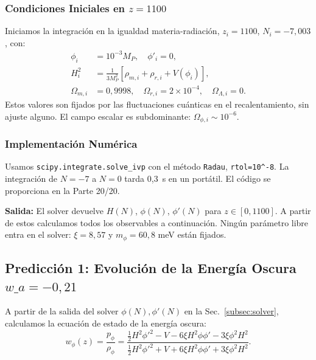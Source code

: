 \documentclass[12pt, a4paper]{article}
\theoremstyle{miuThm}
\theoremstyle{remark}
\begin{document}
\subsubsection{Condiciones Iniciales en $z = 1100$}
Iniciamos la integración en la igualdad materia-radiación, $z_i = 1100$,
$N_i = -7{,}003$, con:
\begin{align}
\phi_i &= 10^{-3} M_P, \quad \phi'_i = 0, \label{eq:IC_phi} \\
H_i^2 &= \frac{1}{3M_P^2}\left[ \rho_{m,i} + \rho_{r,i} + V(\phi_i) \right],
\label{eq:IC_H} \\
\Omega_{m,i} &= 0{,}9998, \quad \Omega_{r,i} = 2 \times 10^{-4}, \quad
\Omega_{\Lambda,i} = 0.
\end{align}
Estos valores son fijados por las fluctuaciones cuánticas en el recalentamiento,
sin ajuste alguno. El campo escalar es subdominante: $\Omega_{\phi,i} \sim 10^{-6}$.

\subsubsection{Implementación Numérica}
Usamos \texttt{scipy.integrate.solve\_ivp} con el método \texttt{Radau},
\texttt{rtol=10\^{}{-8}}. La integración de $N = -7$ a $N = 0$ tarda 0{,}3~s
en un portátil. El código se proporciona en la Parte 20/20.

\textbf{Salida:} El solver devuelve $H(N)$, $\phi(N)$, $\phi'(N)$ para
$z \in [0, 1100]$. A partir de estos calculamos todos los observables a continuación.
Ningún parámetro libre entra en el solver: $\xi = 8{,}57$ y $m_\phi = 60{,}8$ meV
están fijados.

\subsection{Predicción 1: Evolución de la Energía Oscura $w\_a = -0{,}21$}
\label{subsec:wa}

A partir de la salida del solver $\phi(N), \phi'(N)$ en la Sec.~\ref{subsec:solver},
calculamos la ecuación de estado de la energía oscura:
\begin{equation}
w_{\phi}(z) = \frac{p_\phi}{\rho_\phi} = \frac{\frac{1}{2}H^2\phi'^2 - V - 6\xi H^2\phi\phi' - 3\xi\phi^2 H^2}{\frac{1}{2}H^2\phi'^2 + V + 6\xi H^2\phi\phi' + 3\xi\phi^2 H^2}.
\label{eq:w_phi}
\end{equation}
\end{document}
